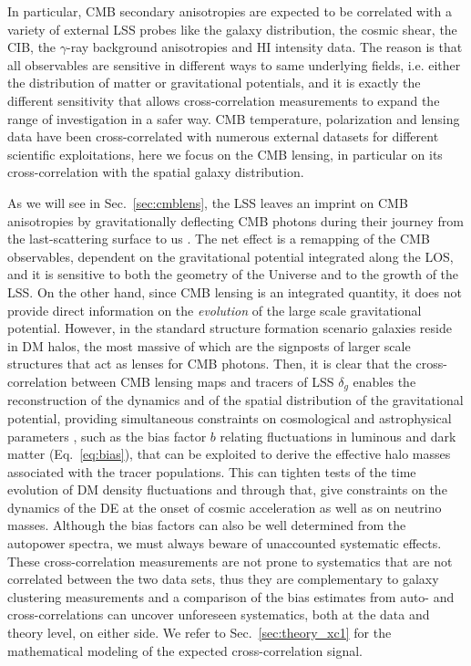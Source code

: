In particular, \gls{CMB} secondary anisotropies are expected to be correlated with a variety of external \gls{LSS} probes like the galaxy distribution, the cosmic shear, the \gls{CIB}, the $\gamma$-ray background anisotropies and HI intensity data. The reason is that all observables are sensitive in different ways to same underlying fields, i.e. either the distribution of matter or gravitational potentials, and it is exactly the different sensitivity that allows cross-correlation measurements to expand the range of investigation in a safer way. \gls{CMB} temperature, polarization and lensing data have been cross-correlated with numerous external datasets for different scientific exploitations, here we focus on the \gls{CMB} lensing, in particular on its cross-correlation with the spatial galaxy distribution.

As we will see in Sec.~\eqref{sec:cmblens}, the \gls{LSS} leaves an imprint on \gls{CMB} anisotropies by gravitationally deflecting \gls{CMB} photons during their journey from the last-scattering surface to us \citep{Lewis2006}. The net effect is a remapping of the \gls{CMB} observables, dependent on the gravitational potential integrated along the \gls{LOS}, and it is sensitive to both the geometry of the Universe and to the growth of the \gls{LSS}. 
On the other hand, since \gls{CMB} lensing is an integrated quantity, it does not provide direct information on the \emph{evolution} of the large scale gravitational potential.
However, in the standard structure formation scenario galaxies reside in \gls{DM} halos, the most massive of which are the signposts of larger scale structures that act as lenses for \gls{CMB} photons.  
Then, it is clear that the cross-correlation between \gls{CMB} lensing maps and tracers of \gls{LSS} $\delta_g$  enables the reconstruction of the dynamics and of the spatial distribution of the gravitational potential, providing simultaneous constraints on cosmological and astrophysical parameters \citep{Pearson2014}, such as the bias factor $b$ relating fluctuations in luminous and dark matter (Eq.~\eqref{eq:bias}), that can be exploited to derive the effective halo masses associated with the tracer populations. 
This can tighten tests of the time evolution of \gls{DM} density fluctuations and through that, give constraints on the dynamics of the \gls{DE} at the onset of cosmic acceleration as well as on neutrino masses.
Although the bias factors can also be well determined from the autopower spectra, we must always beware of unaccounted systematic effects. These cross-correlation measurements are not prone to systematics that are not correlated between the two data sets, thus they are complementary to galaxy clustering measurements and a comparison of the bias estimates from auto- and cross-correlations can uncover unforeseen systematics, both at the data and theory level, on either side. We refer to Sec.~\eqref{sec:theory_xc1} for the mathematical modeling of the expected cross-correlation signal.

